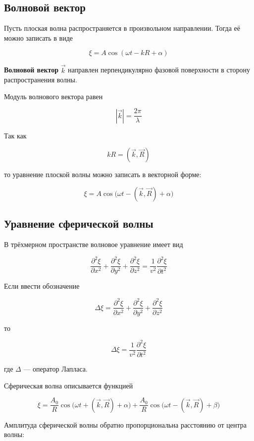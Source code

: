 \documentclass[a4paper,12pt]{article}
\begin{document}
\subsection*{Волновой вектор}

Пусть плоская волна распространяется в произвольном направлении. Тогда её можно записать в виде

\[
\xi = A \cos(\omega t - kR + \alpha)
\]

\begin{definitionbox}
\textbf{Волновой вектор} \(\vec k\) направлен перпендикулярно фазовой поверхности в сторону распространения волны.
\end{definitionbox}

Модуль волнового вектора равен

\[
|\vec k| = \frac{2\pi}{\lambda}
\]

Так как

\[
kR = (\vec k,\vec R)
\]

то уравнение плоской волны можно записать в векторной форме:

\[
\xi = A \cos\bigl(\omega t - (\vec k,\vec R) + \alpha\bigr)
\]

\subsection*{Уравнение сферической волны}

В трёхмерном пространстве волновое уравнение имеет вид

\[
\frac{\partial^2 \xi}{\partial x^2}
+
\frac{\partial^2 \xi}{\partial y^2}
+
\frac{\partial^2 \xi}{\partial z^2}
=
\frac{1}{v^2}\frac{\partial^2 \xi}{\partial t^2}
\]

Если ввести обозначение

\[
\Delta \xi =
\frac{\partial^2 \xi}{\partial x^2}
+
\frac{\partial^2 \xi}{\partial y^2}
+
\frac{\partial^2 \xi}{\partial z^2}
\]

то

\[
\Delta \xi =
\frac{1}{v^2}\frac{\partial^2 \xi}{\partial t^2}
\]

где \(\Delta\) — оператор Лапласа.

Сферическая волна описывается функцией

\[
\xi =
\frac{A_0}{R}\cos\bigl(\omega t + (\vec k,\vec R) + \alpha\bigr)
+
\frac{A_0}{R}\cos\bigl(\omega t - (\vec k,\vec R) + \beta\bigr)
\]

Амплитуда сферической волны обратно пропорциональна расстоянию от центра волны:
\end{document}

